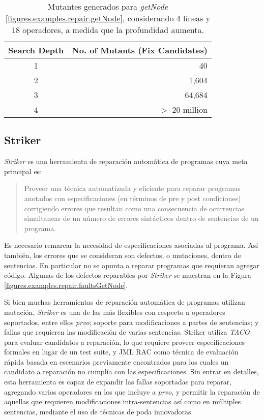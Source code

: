 \begin{table}[t]
	\begin{center}
		\small
		\begin{tabular}{c r}
			Search Depth                            &	No. of Mutants (Fix Candidates)        \\
			\hline
			1 					&	40		                               	\\
			2 					&	1,604			                \\
			3 					&	64,684		        	        \\
			4 					&	$>$ 20 million		                
		\end{tabular}
		\normalsize
	\end{center}
	\caption{Mutantes generados para \emph{getNode} \ref{figures.examples.repair.getNode}, considerando 4 l\'ineas y 18 operadores, a medida que la profundidad aumenta.}
	\label{tables.repair.mutation.explosion}
\end{table}


\subsection{Striker}
\label{sec:repair.striker}

\emph{Striker} es una herramienta de reparaci\'on autom\'atica de programas cuya meta principal es:
\begin{quote}
	Proveer una t\'ecnica automatizada y eficiente para reparar programas anotados con especificaciones (en t\'erminos de pre y post condiciones) corrigiendo errores que resultan como una consecuencia de ocurrencias simultaneas de un n\'umero de errores sint\'acticos dentro de sentencias de un programa.
\end{quote}
Es necesario remarcar la necesidad de especificaciones asociadas al programa. As\'i tambi\'en, los errores que se consideran son defectos, o mutaciones, dentro de sentencias. En particular no se apunta a reparar programas que requieran agregar c\'odigo. Algunas de los defectos reparables por \emph{Striker} se muestran en la Figura \ref{figures.examples.repair.faultsGetNode}.

Si bien muchas herramientas de reparaci\'on autom\'atica de programas utilizan mutaci\'on, \emph{Striker} es una de las m\'as flexibles con respecto a operadores soportados, entre ellos \emph{prvo}; soporte para modificaciones a partes de sentencias; y fallas que requieren las modificaci\'on de varias sentencias. Striker utiliza \emph{TACO} \cite{bibliography.mutation.tools.TACOGaleottiRPF13} para evaluar candidatos a reparaci\'on, lo que requiere proveer especificaciones formales en lugar de un test suite, y JML RAC \cite{bibliography.misc.JMLRAC.LeavensCCRC02} como t\'ecnica de evaluaci\'on r\'apida basada en escenarios previamente encontrados para los cuales un candidato a reparaci\'on no cumpl\'ia con las especificaciones. Sin entrar en detalles, esta herramienta es capaz de expandir las fallas soportadas para reparar, agregando varios operadores en los que incluye a \emph{prvo}, y permitir la reparaci\'on de aquellas que requieren modificaciones intra-sentencias as\'i como en m\'ultiples sentencias, mediante el uso de t\'ecnicas de poda innovadoras.

